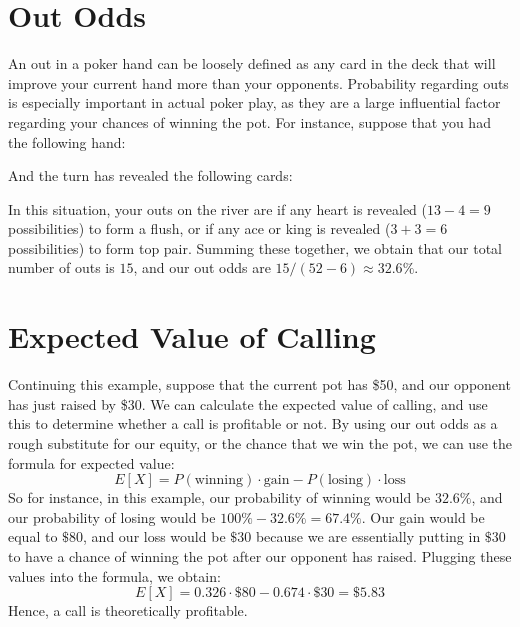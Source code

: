 \documentclass{article}
\begin{document}
\section*{Out Odds}
An out in a poker hand can be loosely defined as any card in the deck that will improve your current hand more than your opponents. Probability regarding outs is especially important in actual poker play, as they are a large influential factor regarding your chances of winning the pot. For instance, suppose that you had the following hand:
\begin{center}
\end{center}

And the turn has revealed the following cards:
\begin{center}
\end{center}

In this situation, your outs on the river are if any heart is revealed 
($13-4 = 9$ possibilities) to form a flush, or if any ace or king is 
revealed ($3+3 = 6$ possibilities) to form top pair. Summing these 
together, we obtain that our total number of outs is $15$, and our 
out odds are $15/(52-6) \approx 32.6\%$.

\section*{Expected Value of Calling}

Continuing this example, suppose that the current pot has \$50, and our 
opponent has just raised by \$30. We can calculate the expected value 
of calling, and use this to determine whether a call is profitable or 
not. By using our out odds as a rough substitute for our equity, or the 
chance that we win the pot, we can use the formula for expected value: 
\[
    E[X] = P(\text{winning}) \cdot \text{gain} - P(\text{losing}) \cdot \text{loss}
\]
So for instance, in this example, our probability of winning would be 
$32.6\%$, and our probability of losing would be $100\%-32.6\% = 67.4\%$. 
Our gain would be equal to $\$80$, and our loss would be $\$30$ because 
we are essentially putting in $\$30$ to have a chance of winning the pot 
after our opponent has raised. Plugging these values into the formula, 
we obtain:
\[
    E[X] = 0.326 \cdot \$80 - 0.674 \cdot \$30 = \$5.83
\]
Hence, a call is theoretically profitable. \\
\end{document}
